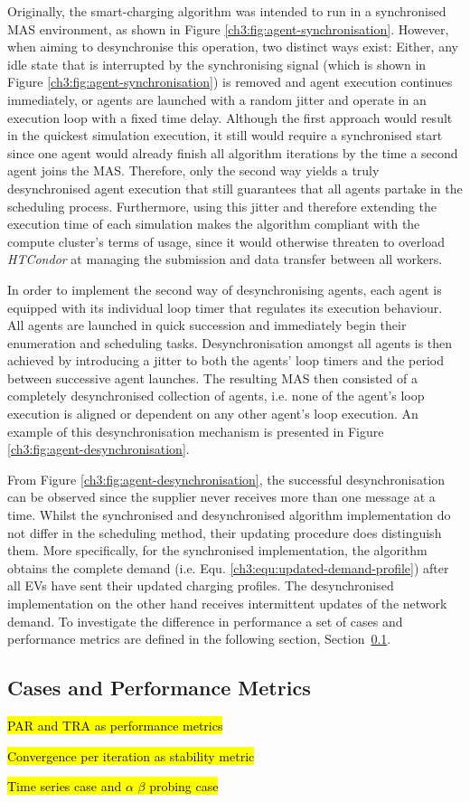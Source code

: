 Originally, the smart-charging algorithm was intended to run in a synchronised MAS environment, as shown in Figure \ref{ch3:fig:agent-synchronisation}.
However, when aiming to desynchronise this operation, two distinct ways exist:
Either, any idle state that is interrupted by the synchronising signal (which is shown in Figure \ref{ch3:fig:agent-synchronisation}) is removed and agent execution continues immediately, or agents are launched with a random jitter and operate in an execution loop with a fixed time delay.
Although the first approach would result in the quickest simulation execution, it still would require a synchronised start since one agent would already finish all algorithm iterations by the time a second agent joins the MAS.
Therefore, only the second way yields a truly desynchronised agent execution that still guarantees that all agents partake in the scheduling process.
Furthermore, using this jitter and therefore extending the execution time of each simulation makes the algorithm compliant with the compute cluster's terms of usage, since it would otherwise threaten to overload \textit{HTCondor} at managing the submission and data transfer between all workers.

In order to implement the second way of desynchronising agents, each agent is equipped with its individual loop timer that regulates its execution behaviour.
All agents are launched in quick succession and immediately begin their enumeration and scheduling tasks.
Desynchronisation amongst all agents is then achieved by introducing a jitter to both the agents' loop timers and the period between successive agent launches.
The resulting MAS then consisted of a completely desynchronised collection of agents, i.e. none of the agent's loop execution is aligned or dependent on any other agent's loop execution.
An example of this desynchronisation mechanism is presented in Figure \ref{ch3:fig:agent-desynchronisation}.



From Figure \ref{ch3:fig:agent-desynchronisation}, the successful desynchronisation can be observed since the supplier never receives more than one message at a time.
Whilst the synchronised and desynchronised algorithm implementation do not differ in the scheduling method, their updating procedure does distinguish them.
More specifically, for the synchronised implementation, the algorithm obtains the complete demand (i.e. Equ. \ref{ch3:equ:updated-demand-profile}) after all EVs have sent their updated charging profiles.
The desynchronised implementation on the other hand receives intermittent updates of the network demand.
To investigate the difference in performance a set of cases and performance metrics are defined in the following section, Section~\ref{ch3:subsec:cases-and-metrics}.

\subsection{Cases and Performance Metrics}
\label{ch3:subsec:cases-and-metrics}

\hl{PAR and TRA as performance metrics}

\hl{Convergence per iteration as stability metric}

\hl{Time series case and $\alpha$ $\beta$ probing case}






